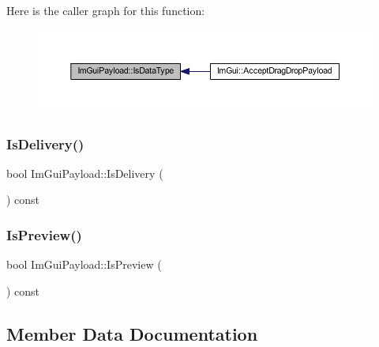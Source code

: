 Here is the caller graph for this function\+:
\nopagebreak
\begin{figure}[H]
\begin{center}
\leavevmode
\includegraphics[width=350pt]{struct_im_gui_payload_a7864aeb80bc28683748d015562eead4d_icgraph}
\end{center}
\end{figure}
\mbox{\label{struct_im_gui_payload_adcc193e0d454bf394e76e5498eea808d}} 
\subsubsection{\texorpdfstring{Is\+Delivery()}{IsDelivery()}}
{\footnotesize\ttfamily bool Im\+Gui\+Payload\+::\+Is\+Delivery (\begin{DoxyParamCaption}{ }\end{DoxyParamCaption}) const\hspace{0.3cm}{\ttfamily [inline]}}

\mbox{\label{struct_im_gui_payload_a4a7e17de25fd86c5ada447aaec412070}} 
\subsubsection{\texorpdfstring{Is\+Preview()}{IsPreview()}}
{\footnotesize\ttfamily bool Im\+Gui\+Payload\+::\+Is\+Preview (\begin{DoxyParamCaption}{ }\end{DoxyParamCaption}) const\hspace{0.3cm}{\ttfamily [inline]}}



\subsection{Member Data Documentation}
\mbox{\label{struct_im_gui_payload_af9f974dfb815e21a1ab925cab3769ab9}} 
